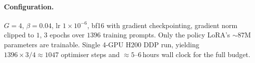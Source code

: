 \paragraph{Configuration.}
$G\!=\!4$, $\beta\!=\!0.04$, lr $1\!\times\!10^{-6}$, bf16 with
gradient checkpointing, gradient norm clipped to $1$, $3$ epochs over
$1396$ training prompts. Only the policy LoRA's $\sim 87$M parameters
are trainable. Single 4-GPU H200 DDP run, yielding
$1396\!\times\!3 / 4 \approx 1047$ optimiser steps and
$\approx 5$--$6$\,hours wall clock for the full budget.
